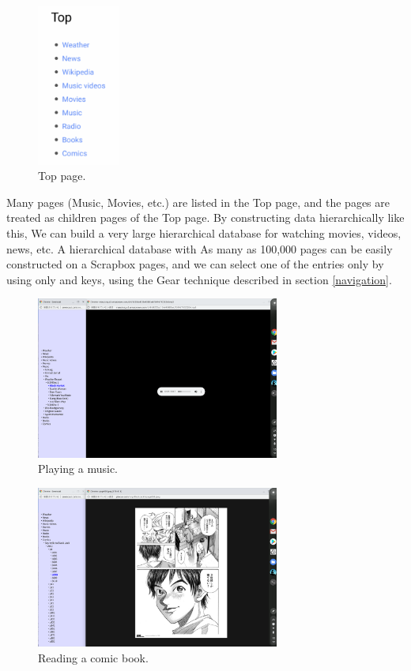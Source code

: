 \documentclass[conference]{IEEEtran}
\def\up{\tsf{▲}}
\def\down{\tsf{▼}}
\def\SB{Scrapbox}
\begin{document}
\begin{figure}[H]
\centerline{\includegraphics[width=27mm,bb=0 0 262 515]{figures/5a644f357ba6a6b81b011e200019d736.png}}
\caption{Top page.}
\label{top}
\end{figure}

Many pages (Music, Movies, etc.) are listed in the Top page, and
the pages are treated as children pages of the Top page.
By constructing data hierarchically like this,
We can build a very large hierarchical database for watching movies, videos, news, etc.
A hierarchical database with
As many as 100,000 pages can be easily constructed on a {\SB} pages, and
we can select one of the entries only by using only {\up} and {\down} keys,
using the Gear technique described in section \ref{navigation}.

\begin{figure}[H]
\centerline{\includegraphics[width=80mm,bb=0 0 2400 1600]{figures/blackmarket.png}}
\caption{Playing a music.}
\label{blackmarket}
\end{figure}

\begin{figure}[H]
\centerline{\includegraphics[width=80mm,bb=0 0 2400 1600]{figures/blackjack.png}}
\caption{Reading a comic book.}
\label{blackjack}
\end{figure}
\end{document}
